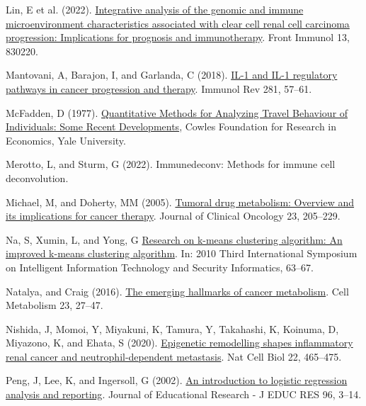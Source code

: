 \documentclass[
  parskip,
  oneside]{scrreprt}
\newlength{\cslhangindent}
\newlength{\cslentryspacingunit} %
\newenvironment{CSLReferences}[2] %
 {%
  \setlength{\parindent}{0pt}
  \ifodd #1
  \let\oldpar\par
  \def\par{\hangindent=\cslhangindent\oldpar}
  \fi
  \setlength{\parskip}{#2\cslentryspacingunit}
 }%
 {}
\begin{document}
\begin{CSLReferences}{0}{0}
\leavevmode{}%
Lin, E et al. (2022).
\href{https://doi.org/10.3389/fimmu.2022.830220}{Integrative analysis of
the genomic and immune microenvironment characteristics associated with
clear cell renal cell carcinoma progression: Implications for prognosis
and immunotherapy}. Front Immunol 13, 830220.

\leavevmode{}%
Mantovani, A, Barajon, I, and Garlanda, C (2018).
\href{https://doi.org/10.1111/imr.12614}{IL-1 and IL-1 regulatory
pathways in cancer progression and therapy}. Immunol Rev 281, 57--61.

\leavevmode{}%
McFadden, D (1977). \href{}{{Quantitative Methods for Analyzing Travel
Behaviour of Individuals: Some Recent Developments}}, Cowles Foundation
for Research in Economics, Yale University.

\leavevmode{}%
Merotto, L, and Sturm, G (2022). Immunedeconv: Methods for immune cell
deconvolution.

\leavevmode{}%
Michael, M, and Doherty, MM (2005).
\href{https://doi.org/10.1200/jco.2005.02.120}{Tumoral drug metabolism:
Overview and its implications for cancer therapy}. Journal of Clinical
Oncology 23, 205--229.

\leavevmode{}%
Na, S, Xumin, L, and Yong, G
\href{https://doi.org/10.1109/IITSI.2010.74}{Research on k-means
clustering algorithm: An improved k-means clustering algorithm}. In:
2010 Third International Symposium on Intelligent Information Technology
and Security Informatics, 63--67.

\leavevmode{}%
Natalya, and Craig (2016).
\href{https://doi.org/10.1016/j.cmet.2015.12.006}{The emerging hallmarks
of cancer metabolism}. Cell Metabolism 23, 27--47.

\leavevmode{}%
Nishida, J, Momoi, Y, Miyakuni, K, Tamura, Y, Takahashi, K, Koinuma, D,
Miyazono, K, and Ehata, S (2020).
\href{https://doi.org/10.1038/s41556-020-0491-2}{Epigenetic remodelling
shapes inflammatory renal cancer and neutrophil-dependent metastasis}.
Nat Cell Biol 22, 465--475.

\leavevmode{}%
Peng, J, Lee, K, and Ingersoll, G (2002).
\href{https://doi.org/10.1080/00220670209598786}{An introduction to
logistic regression analysis and reporting}. Journal of Educational
Research - J EDUC RES 96, 3--14.


\end{CSLReferences}
\end{document}
